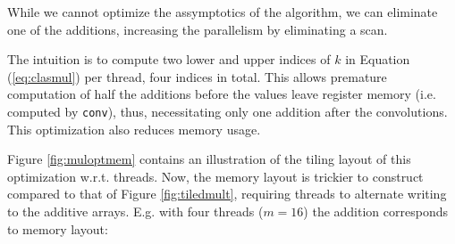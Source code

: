While we cannot optimize the assymptotics of the algorithm, we can eliminate one
of the additions, increasing the parallelism by eliminating a scan.

The intuition is to compute two lower and upper indices of $k$ in Equation
(\ref{eq:clasmul}) per thread, four indices in total. This allows premature
computation of half the additions before the values leave register memory
(i.e. computed by \texttt{conv}), thus, necessitating only one addition after
the convolutions. This optimization also reduces memory usage.

Figure \ref{fig:muloptmem} contains an illustration of the tiling layout of this
optimization w.r.t. threads. Now, the memory layout is trickier to construct
compared to that of Figure \ref{fig:tiledmult}, requiring threads to alternate
writing to the additive arrays. E.g. with four threads ($m = 16$) the addition
corresponds to memory layout:\\


